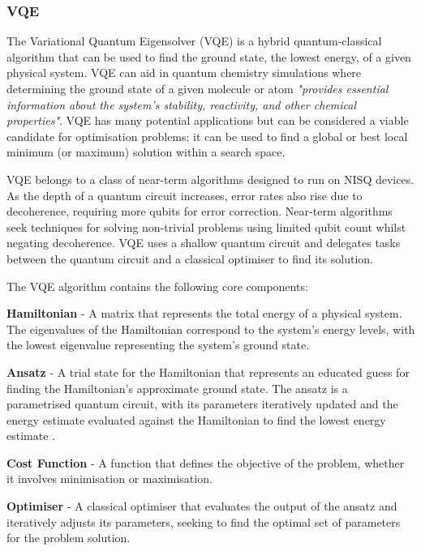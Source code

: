 \documentclass{article}
\begin{document}
{\subsubsection{VQE}

The Variational Quantum Eigensolver (VQE) is a hybrid quantum-classical algorithm that can be used to find the ground state, the lowest energy, of a given physical system\cite{wikivqe}. VQE can aid in quantum chemistry simulations where determining the ground state of a given molecule or atom \textit{"provides essential information about the system's stability, reactivity, and other chemical properties"}\cite{queragroundstate}. VQE has many potential applications but can be considered a viable candidate for optimisation problems; it can be used to find a global or best local minimum (or maximum) solution within a search space\cite{vqeqiskit}\cite{VQEMax}. 

VQE belongs to a class of near-term algorithms designed to run on NISQ devices. As the depth of a quantum circuit increases, error rates also rise due to decoherence, requiring more qubits for error correction. Near-term algorithms seek techniques for solving non-trivial problems using limited qubit count whilst negating decoherence\cite{Huang_2023}. VQE uses a shallow quantum circuit and delegates tasks between the quantum circuit and a classical optimiser to find its solution\cite{vqeqiskit}\cite{Peruzzo2014}.

The VQE algorithm contains the following core components:

\textbf{Hamiltonian} - A matrix that represents the total energy of a physical system\cite{hamiltonian}. The eigenvalues of the Hamiltonian correspond to the system's energy levels, with the lowest eigenvalue representing the system's ground state\cite{vqeqiskit}.

\textbf{Ansatz} - A trial state for the Hamiltonian that represents an educated guess for finding the Hamiltonian's approximate ground state. The ansatz is a parametrised quantum circuit, with its parameters iteratively updated and the energy estimate evaluated against the Hamiltonian to find the lowest energy estimate\cite{ansatz} \cite{wikiansatz} \cite{Tutorial}.

\textbf{Cost Function} - A function that defines the objective of the problem, whether it involves minimisation or maximisation\cite{vqeqiskit}.

\textbf{Optimiser} - A classical optimiser that evaluates the output of the ansatz and iteratively adjusts its parameters, seeking to find the optimal set of parameters for the problem solution\cite{Tutorial}\cite{vqeqiskit}. 

}
\end{document}
